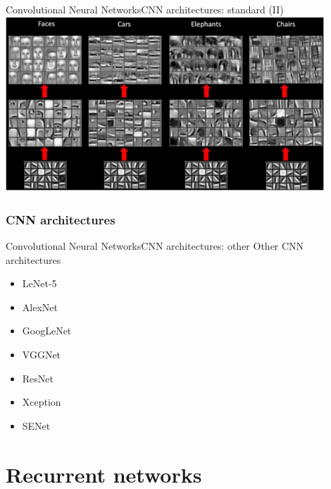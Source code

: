 \documentclass[10pt,compress]{beamer} %
\begin{document}
{\blackSlide
\begin{frame}{Convolutional Neural Networks}{CNN architectures: standard (II)}
	\centering
        \includegraphics[width=0.9\textwidth]{figs/features.png}
\end{frame}
}

\subsubsection{CNN architectures}
\begin{frame}{Convolutional Neural Networks}{CNN architectures: other}
    Other CNN architectures
    \begin{itemize}
        \item LeNet-5
        \item AlexNet
        \item GoogLeNet
        \item VGGNet
        \item ResNet
        \item Xception
        \item SENet
    \end{itemize}
\end{frame}


\section{Recurrent networks}
\end{document}
